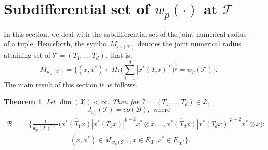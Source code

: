 \documentclass{amsart}
\newtheorem{theorem}{Theorem}[section]
\theoremstyle{definition}
\theoremstyle{remark}
\numberwithin{equation}{section}
\begin{document}
\section{Subdifferential set of $w_p(\cdot)$ at $\mathcal{T}$}
In this section, we deal with the subdifferential set of the joint numerical radius of a tuple. Henceforth, the symbol $M_{w_p(\mathcal{T})}$ denotes the joint  numerical radius attaining set of $\mathcal{T}=(T_1,\ldots,T_d),$ that is,
\[M_{w_p(\mathcal{T})}=\bigg\{(x,x^*)\in \Pi:\Big(\sum_{i=1}^d|x^*(T_ix)|^p\Big)^{\frac{1}{p}}=w_p(\mathcal{T})\bigg\}.\]
The main result of this section is as follows.
\begin{theorem}\label{th-03}
	Let $\dim(\mathcal{X})<\infty.$ Then for $\mathcal{T}=(T_1,\ldots,T_d)\in \mathcal{Z},$ 
	\[J_{w_p}(\mathcal{T})=co(\mathcal{B}), \text{ where}\] 
	  \begin{eqnarray*}
		\mathcal{B}&=&\bigg\{\frac{1}{w_p(\mathcal{T})^{p-1}}\bigg(\overline{x^*(T_1x)}|x^*(T_1x)|^{p-2}x^*\otimes x,\ldots,\overline{x^*(T_dx)}|x^*(T_dx)|^{p-2}x^*\otimes x\bigg):\\
		&&\quad \quad \quad \quad \quad \quad(x,x^*)\in M_{w_p(\mathcal{T})}, x\in E_{\mathcal{X}},x^*\in E_{\mathcal{X}^*}\bigg\}.
	\end{eqnarray*}
\end{theorem}
\end{document}
